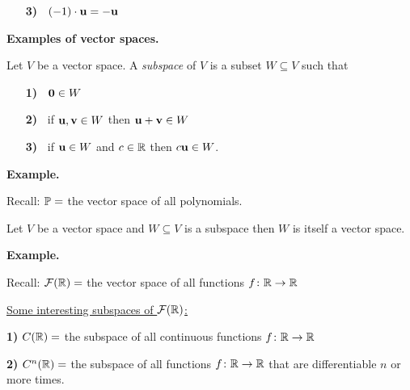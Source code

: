 {\begin{cbox}[Theorem]
\begin{itemize}
\item[\textbf{3)\ }] $(-1)\cdot {\bf u} = -{\bf u}$
\end{itemize}
\end{cbox}

\newpage

{\bf Examples of vector spaces.}


\newpage



\begin{cbox}[Defitnition]
Let $V$ be a vector space. A \emph{subspace} of $V$ is a subset $W\subseteq V$ such that 
\begin{itemize}
\item[\textbf{1)\ }] ${\bf 0} \in W$

\vskip 3mm

\item[\textbf{2)\ }] if ${\bf u}, {\bf v} \in W$ then ${\bf u} + {\bf v} \in W$

\vskip 3mm

\item[\textbf{3)\ }] if ${\bf u}\in W$ and $c\in {\mathbb R}$ then $c{\bf u}\in W$. 
\end{itemize}
\end{cbox}

\vskip 5mm

{\bf Example.} 

\vskip 3mm

Recall: ${\mathbb P} = $ the vector space of all polynomials.  

\vfill

\begin{cbox}[Proposition]
Let $V$ be a vector space and $W\subseteq V$ is a subspace then $W$ is itself 
a vector space. 
\end{cbox}


\newpage

{\bf Example.} 

\vskip 3mm

Recall: ${\mathcal F}({\mathbb R}) = $ the vector space of all functions $f\colon {\mathbb R} \to {\mathbb R}$

\vskip 10mm

\underline{Some interesting subspaces of ${\mathcal F}({\mathbb R})$:}

\vskip 7mm

{\bf 1)} $C({\mathbb R}) = $ the subspace of all continuous functions $f\colon {\mathbb R}\to {\mathbb R}$

\vskip 7mm

{\bf 2)} $C^{n}({\mathbb R}) = $ the subspace of all  functions $f\colon {\mathbb R}\to {\mathbb R}$ that are differentiable $n$ or more times. 

}
